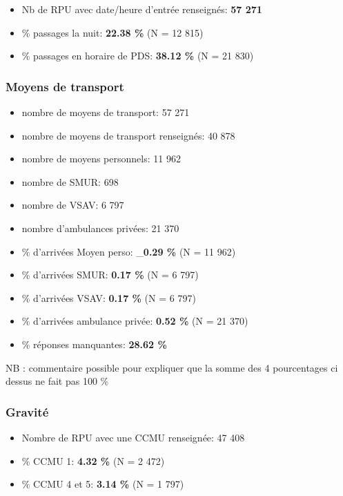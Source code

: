 \documentclass[]{article}
\begin{document}
\begin{itemize}
\itemsep1pt\parskip0pt
\item
  Nb de RPU avec date/heure d'entrée renseignés: \textbf{57 271}
\item
  \% passages la nuit: \textbf{22.38 \%} (N = 12 815)
\item
  \% passages en horaire de PDS: \textbf{38.12 \%} (N = 21 830)
\end{itemize}

\subsubsection{Moyens de transport}\label{moyens-de-transport}

\begin{itemize}
\item
  nombre de moyens de transport: 57 271
\item
  nombre de moyens de transport renseignés: 40 878
\item
  nombre de moyens personnels: 11 962
\item
  nombre de SMUR: 698
\item
  nombre de VSAV: 6 797
\item
  nombre d'ambulances privées: 21 370
\item
  \% d'arrivées Moyen perso: \_\textbf{0.29 \%} (N = 11 962)
\item
  \% d'arrivées SMUR: \textbf{0.17 \%} (N = 6 797)
\item
  \% d'arrivées VSAV: \textbf{0.17 \%} (N = 6 797)
\item
  \% d'arrivées ambulance privée: \textbf{0.52 \%} (N = 21 370)
\item
  \% réponses manquantes: \textbf{28.62 \%}
\end{itemize}

NB : commentaire possible pour expliquer que la somme des 4 pourcentages
ci dessus ne fait pas 100 \%

\subsubsection{Gravité}\label{gravite}

\begin{itemize}
\itemsep1pt\parskip0pt
\item
  Nombre de RPU avec une CCMU renseignée: 47 408
\item
  \% CCMU 1: \textbf{4.32 \%} (N = 2 472)
\item
  \% CCMU 4 et 5: \textbf{3.14 \%} (N = 1 797)
\end{itemize}
\end{document}
